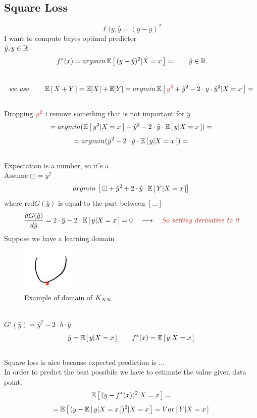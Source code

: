 \documentclass[../main.tex]{subfiles}
\begin{document}
\subsection{Square Loss}
$$\ell(y,\hat{y} = (y - \hat{y})^2$$
I want to compute bayes optimal predictor\\
$\hat{y}, y \in \mathbb{R}$
\\
$$
f^*(x) = argmin \, \mathbb{E} \left[ \, (y-\hat{y})^2 | X = x \, \right] = \qquad \hat{y} \in \mathbb{R}
$$\
$$
\textit{we use }\qquad \barra{E}\left[\,X+Y\,\right] = \barra{E}[X] + \barra{E}[Y] = argmin \, \barra{E}\left[\,\red{y^2} + \hat{y}^2- 2\cdot y \cdot \hat{y}^2 | X = x \, \right] = 
$$
\\
Dropping $\red{y^2}$ i remove something that is not important for $\hat{y}$
\\
$$
= argmin ( \mathbb{E} \left[\, y^2 | X = x\, \right] + \hat{y}^2 - 2 \cdot \hat{y} \cdot \mathbb{E} \left[ \, y | X = x \, \right] ) = 
$$
$$
= argmin (\hat{y}^2 - 2 \cdot \hat{y} \cdot \mathbb{E} \left[ \, y | X = x \, \right] ) =
$$
\\ Expectation is a number, so it's a 
\\
Assume $ \boxdot = y^2 $
$$
argmin \, \left[\, \boxdot + \hat{y}^2 + 2 \cdot \hat{y} \cdot \mathbb{E} \left[\, Y|X =x\,\right] \right]
$$
where red{$G(\hat{y})$ is equal to the part between $\left[...\right]$}
$$
\frac{d G(\hat{y})}{d\hat{y}} = 2 \cdot \hat{y}- 2 \cdot \barra{E} \left[ \, y | X= x \, \right] = 0  \quad \longrightarrow \quad \red{\textit{So setting derivative to 0}}
$$
Suppose we have a learning domain\\
\begin{figure}[h]
    \centering
    \includegraphics[width=0.1\linewidth]{../img/lez6-img0.JPG}
    \caption{Example of domain of $K_{NN}$}
\end{figure}
\\
$G' (\hat{y}) = \hat{y}^2 - 2\cdot b \cdot \hat{y}$
\\
$$
\hat{y} = \mathbb{E} \left[ \, y| X= x \, \right] \qquad f^*(x) = \mathbb{E} \left[ \, y | X = x \, \right]
$$
\\
Square loss is nice because expected prediction is ...\\
In order to predict the best possibile we have to estimate the value given data
point.
\\
$$ 
\mathbb{E} \left[ \, (y- f^*(x))^2 | X = x \, \right] = 
$$
$$
= \mathbb{E} \left[ \, (y- \mathbb{E} \left[ \, y | X = x \,\right] )^2 | X = x \, \right] = Var \left[ \, Y | X = x \, \right]
$$
\\
\end{document}
